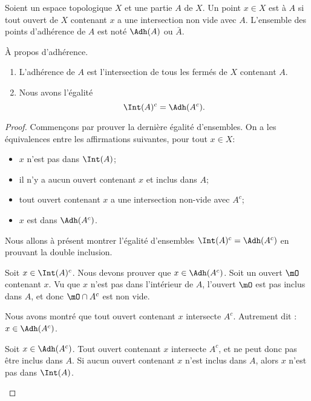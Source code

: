 \begin{definition}      \label{DEFooSVWMooLpAVZR}
	Soient un espace topologique \( X\) et une partie \( A\) de \( X\). Un point \( x\in X\) est  à \( A\) si tout ouvert de \( X\) contenant \( x\) a une intersection non vide avec \( A\). L'ensemble des points d'adhérence de \( A\) est noté \( \Adh(A)\) ou \( \bar A\).
\end{definition}

\begin{lemma}       \label{LEMooILNCooOFZaTe}
	À propos d'adhérence.
	\begin{enumerate}
		\item
		      L'adhérence de \( A\) est l'intersection de tous les fermés de \( X\) contenant \( A\).
		\item
		      Nous avons l'égalité
		      \begin{equation}
			      \Int(A)^c = \Adh(A^c).
		      \end{equation}
	\end{enumerate}
\end{lemma}

\begin{proof}
	Commençons par prouver la dernière égalité d'ensembles. On a les équivalences entre les affirmations suivantes, pour tout \( x \in X\):
	\begin{itemize}
		\item \( x\) n'est pas dans \( \Int(A)\);
		\item il n'y a aucun ouvert contenant \( x\) et inclus dans \( A\);
		\item tout ouvert contenant \( x\) a une intersection non-vide avec \( A^c\);
		\item \( x\) est dans \( \Adh({A^c})\).
	\end{itemize}
	Nous allons à présent montrer l'égalité d'ensembles \( \Int(A)^c=\Adh(A^c) \) en prouvant la double inclusion.
	\begin{subproof}
		Soit \( x\in \Int(A)^c\). Nous devons prouver que \( x\in \Adh(A^c)\). Soit un ouvert \( \mO\) contenant \( x\). Vu que \( x\) n'est pas dans l'intérieur de \( A\), l'ouvert \( \mO\) est pas inclus dans \( A\), et donc \( \mO\cap A^c\) est non vide.

		Nous avons montré que tout ouvert contenant \( x\) intersecte \( A^c\). Autrement dit : \( x\in\Adh(A^c)\).


		Soit \( x\in \Adh(A^c)\). Tout ouvert contenant \( x\) intersecte \( A^c\), et ne peut donc pas être inclus dans \( A\). Si aucun ouvert contenant \( x\) n'est inclus dans \( A\), alors \( x\) n'est pas dans \( \Int(A)\).
	\end{subproof}
\end{proof}


